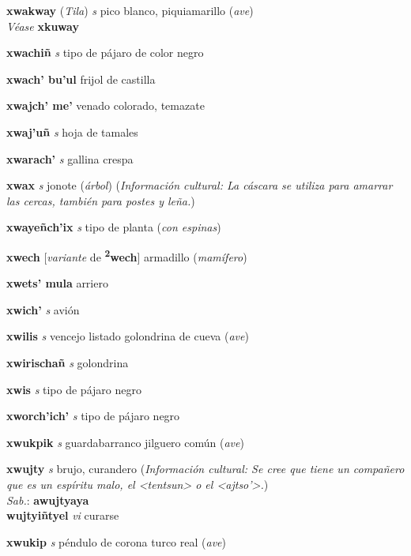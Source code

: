 \documentclass[10pt]{scrbook}
\newcommand{\entry}[1]{\textbf{#1}}
\newcommand{\partofspeech}[1]{\textit{#1}}
\newcommand{\spanishtranslation}[1]{#1}
\newcommand{\clarification}[1]{(\textit{#1})}
\newcommand{\dialectvariant}[1]{\\\textit{#1}:}
\newcommand{\dialectword}[1]{\textbf{#1}}
\newcommand{\alsosee}[1]{\\\textit{Véase} \textbf{#1}}
\newcommand{\relevantdialect}[1]{(\textit{#1})}
\newcommand{\culturalinformation}[1]{(\textit{#1})}
\newcommand{\secondaryentry}[1]{\\\textbf{#1}}
\newcommand{\secondpartofspeech}[1]{\textit{#1}}
\newcommand{\secondtranslation}[1]{#1}
\newcommand{\conjugationtense}[1]{[\textit{#1}}
\newcommand{\conjugationverb}[1]{de \textbf{#1}]}
\begin{document}
\begin{multicols}{2}
\entry{xwakway}
\relevantdialect{Tila}
\partofspeech{s}
\spanishtranslation{pico blanco, piquiamarillo}
\clarification{ave}
\alsosee{xkuway}

\entry{xwachiñ}
\partofspeech{s}
\spanishtranslation{tipo de pájaro de color negro}

\entry{xwach' bu'ul}
\spanishtranslation{frijol de castilla}

\entry{xwajch' me'}
\spanishtranslation{venado colorado, temazate}

\entry{xwaj'uñ}
\partofspeech{s}
\spanishtranslation{hoja de tamales}

\entry{xwarach'}
\partofspeech{s}
\spanishtranslation{gallina crespa}

\entry{xwax}
\partofspeech{s}
\spanishtranslation{jonote}
\clarification{árbol}
\culturalinformation{Información cultural: La cáscara se utiliza para amarrar las cercas, también para postes y leña.}

\entry{xwayeñch'ix}
\partofspeech{s}
\spanishtranslation{tipo de planta}
\clarification{con espinas}

\entry{xwech}
\conjugationtense{variante}
\conjugationverb{\textsuperscript{2}wech}
\spanishtranslation{armadillo}
\clarification{mamífero}

\entry{xwets' mula}
\spanishtranslation{arriero}

\entry{xwich'}
\partofspeech{s}
\spanishtranslation{avión}

\entry{xwilis}
\partofspeech{s}
\spanishtranslation{vencejo listado}
\spanishtranslation{golondrina de cueva}
\clarification{ave}

\entry{xwirischañ}
\partofspeech{s}
\spanishtranslation{golondrina}

\entry{xwis}
\partofspeech{s}
\spanishtranslation{tipo de pájaro negro}

\entry{xworch'ich'}
\partofspeech{s}
\spanishtranslation{tipo de pájaro negro}

\entry{xwukpik}
\partofspeech{s}
\spanishtranslation{guardabarranco}
\spanishtranslation{jilguero común}
\clarification{ave}

\entry{xwujty}
\partofspeech{s}
\spanishtranslation{brujo, curandero}
\culturalinformation{Información cultural: Se cree que tiene un compañero que es un espíritu malo, el <tentsun> o el <ajtso'>.}
\dialectvariant{Sab.}
\dialectword{awujtyaya}
\secondaryentry{wujtyiñtyel}
\secondpartofspeech{vi}
\secondtranslation{curarse}

\entry{xwukip}
\partofspeech{s}
\spanishtranslation{péndulo de corona}
\spanishtranslation{turco real}
\clarification{ave}


\end{multicols}
\end{document}
